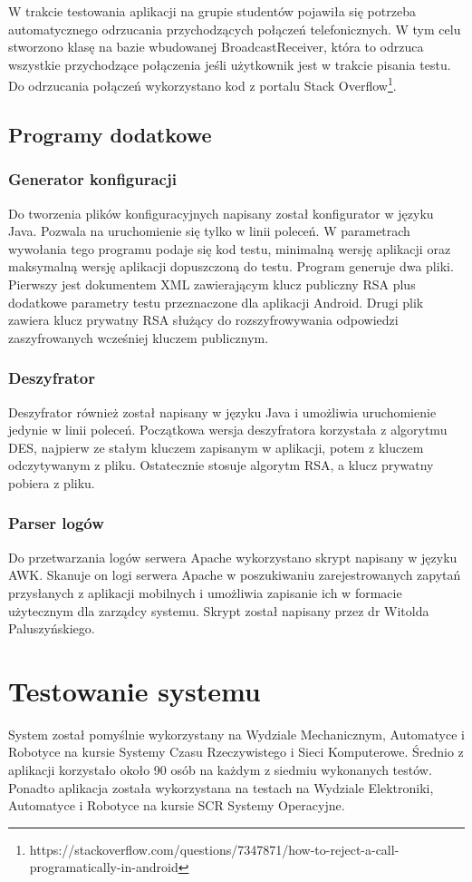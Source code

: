 \documentclass{report}
\begin{document}
			W trakcie testowania aplikacji na grupie studentów pojawiła się potrzeba automatycznego odrzucania przychodzących połączeń telefonicznych. W tym celu stworzono klasę na bazie wbudowanej BroadcastReceiver, która to odrzuca wszystkie przychodzące połączenia jeśli użytkownik jest w trakcie pisania testu. Do odrzucania połączeń wykorzystano kod z portalu Stack Overflow\footnote{https://stackoverflow.com/questions/7347871/how-to-reject-a-call-programatically-in-android}.
			
		\section{Programy dodatkowe}
		
			\subsection{Generator konfiguracji}
			Do tworzenia plików konfiguracyjnych napisany został konfigurator w języku Java. Pozwala na uruchomienie się tylko w linii poleceń. W parametrach wywołania tego programu podaje się kod testu, minimalną wersję aplikacji oraz maksymalną wersję aplikacji dopuszczoną do testu. Program generuje dwa pliki. Pierwszy jest dokumentem XML zawierającym klucz publiczny RSA plus dodatkowe parametry testu przeznaczone dla aplikacji Android. Drugi plik zawiera klucz prywatny RSA służący do rozszyfrowywania odpowiedzi zaszyfrowanych wcześniej kluczem publicznym.
			
			\subsection{Deszyfrator}
			Deszyfrator również został napisany w języku Java i umożliwia uruchomienie jedynie w linii poleceń. Początkowa wersja deszyfratora korzystała z algorytmu DES, najpierw ze stałym kluczem zapisanym w aplikacji, potem z kluczem odczytywanym z pliku. Ostatecznie stosuje algorytm RSA, a klucz prywatny pobiera z pliku.
			
			\subsection{Parser logów}
			Do przetwarzania logów serwera Apache wykorzystano skrypt napisany w języku AWK. Skanuje on logi serwera Apache w poszukiwaniu zarejestrowanych zapytań przysłanych z aplikacji mobilnych i umożliwia zapisanie ich w formacie użytecznym dla zarządcy systemu. Skrypt został napisany przez dr Witolda Paluszyńskiego.
			

	\chapter{Testowanie systemu}
	
	System został pomyślnie wykorzystany na Wydziale Mechanicznym, Automatyce i Robotyce na kursie Systemy Czasu Rzeczywistego i Sieci Komputerowe. Średnio z aplikacji korzystało około 90 osób na każdym z siedmiu wykonanych testów. Ponadto aplikacja została wykorzystana na testach na Wydziale Elektroniki, Automatyce i Robotyce na kursie SCR Systemy Operacyjne.
		
			
\end{document}
